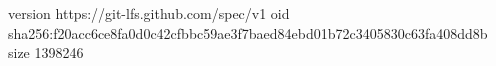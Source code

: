 version https://git-lfs.github.com/spec/v1
oid sha256:f20acc6ce8fa0d0c42cfbbc59ae3f7baed84ebd01b72c3405830c63fa408dd8b
size 1398246
